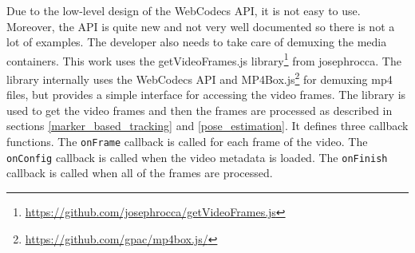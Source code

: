 Due to the low-level design of the WebCodecs API, it is not easy to use. Moreover, the API is quite new and not very well documented so there is not a lot of examples. The developer also needs to take care of demuxing the media containers. This work uses the getVideoFrames.js library\footnote{\url{https://github.com/josephrocca/getVideoFrames.js}} from josephrocca. The library internally uses the WebCodecs API and MP4Box.js\footnote{\url{https://github.com/gpac/mp4box.js/}} for demuxing mp4 files, but provides a simple interface for accessing the video frames. The library is used to get the video frames and then the frames are processed as described in sections \ref{marker_based_tracking} and \ref{pose_estimation}. It defines three callback functions. The \texttt{onFrame} callback is called for each frame of the video. The \texttt{onConfig} callback is called when the video metadata is loaded. The \texttt{onFinish} callback is called when all of the frames are processed.






